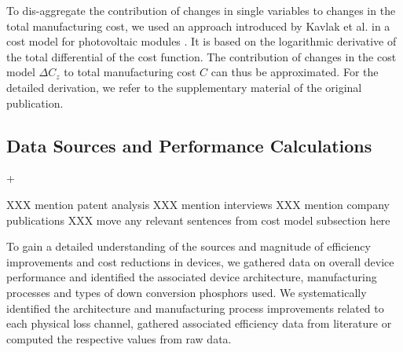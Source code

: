 \documentclass[a4paper,nocompress]{spie}  %
\begin{document}
        To dis-aggregate the contribution of changes in single variables to changes in the total manufacturing cost, we used an approach introduced by Kavlak et al. in a cost model for photovoltaic modules \cite{kavlak2018evaluating}. It is based on the logarithmic derivative of the total differential of the cost function. The contribution of changes in the cost model $\Delta C_z$ to total manufacturing cost $C$ can thus be approximated. For the detailed derivation, we refer to the supplementary material of the original publication.
    
    \subsection{Data Sources and Performance Calculations}+
    
        XXX mention patent analysis
        XXX mention interviews
        XXX mention company publications
        XXX move any relevant sentences from cost model subsection here
    
        To gain a detailed understanding of the sources and magnitude of efficiency improvements and cost reductions in devices, we gathered data on overall device performance and identified the associated device architecture, manufacturing processes and types of down conversion phosphors used. We systematically identified the architecture and manufacturing process improvements related to each physical loss channel, gathered associated efficiency data from literature or computed the respective values from raw data.
        
\end{document}
